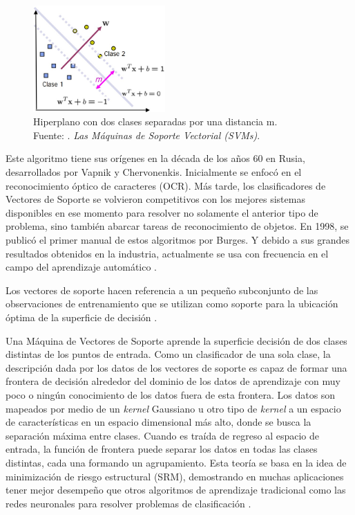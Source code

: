 \begin{itemize}
\begin{figure}[h]
		\begin{center}
			\includegraphics[width=0.45\textwidth]{2/figures/svm_hiperplano.jpg}
			\caption[Hiperplano con dos clases separadas por una distancia m]{Hiperplano con dos clases separadas por una distancia m.\\
			Fuente: \cite{tec_betancourt2005svm}. \textit{Las Máquinas de Soporte Vectorial (SVMs)}.}
			\label{2:fig36}
		\end{center}
	\end{figure}
	
	Este algoritmo tiene sus orígenes en la década de los años 60 en Rusia, desarrollados por Vapnik y Chervonenkis. Inicialmente se enfocó en el reconocimiento óptico de caracteres (OCR). Más tarde, los clasificadores de Vectores de Soporte se volvieron competitivos con los mejores sistemas disponibles en ese momento para resolver no solamente el anterior tipo de problema, sino también abarcar tareas de reconocimiento de objetos. En 1998, se publicó el primer manual de estos algoritmos por Burges. Y debido a sus grandes resultados obtenidos en la industria, actualmente se usa con frecuencia en el campo del aprendizaje automático \parencite{tec_smola2004svm}.
	
	Los vectores de soporte hacen referencia a un pequeño subconjunto de las observaciones de entrenamiento que se utilizan como soporte para la ubicación óptima de la superficie de decisión \parencite{gl_mathworks_svm}.
	
	Una Máquina de Vectores de Soporte aprende la superficie decisión de dos clases distintas de los puntos de entrada. Como un clasificador de una sola clase, la descripción dada por los datos de los vectores de soporte es capaz de formar una frontera de decisión alrededor del dominio de los datos de aprendizaje con muy poco o ningún conocimiento de los datos fuera de esta frontera. Los datos son mapeados por medio de un \textit{kernel} Gaussiano u otro tipo de \textit{kernel} a un espacio de características en un espacio dimensional más alto, donde se busca la separación máxima entre clases. Cuando es traída de regreso al espacio de entrada, la función de frontera puede separar los datos en todas las clases distintas, cada una formando un agrupamiento. Esta teoría se basa en la idea de minimización de riesgo estructural (SRM), demostrando en muchas aplicaciones tener mejor desempeño que otros algoritmos de aprendizaje tradicional como las redes neuronales para resolver problemas de clasificación \parencite{tec_betancourt2005svm}.
	

\end{itemize}
